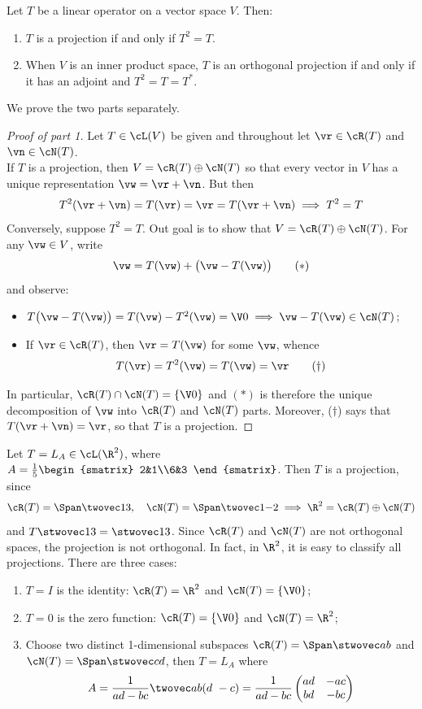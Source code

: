\begin{thm}{}{}
Let $T$ be a linear operator on a vector space $V$. Then:
\begin{enumerate}
  \item $T$ is a projection if and only if $T^2=T$.
  \item When $V$ is an inner product space, $T$ is an orthogonal projection if and only if it has an adjoint and $T^2=T=T^*$. 
\end{enumerate}
\end{thm}

We prove the two parts separately.

\begin{proof}[Proof of part 1]
Let $T\in\cL(V)$ be given and throughout let $\vr\in\cR(T)$ and $\vn\in\cN(T)$.\\[5pt]
  If $T$ is a projection, then $V=\cR(T)\oplus \cN(T)$ so that every vector in $V$ has a unique representation $\vw=\vr+\vn$. But then
  \[T^2(\vr+\vn)=T(\vr)=\vr=T(\vr+\vn)\implies T^2=T\]
  Conversely, suppose $T^2=T$. Out goal is to show that $V=\cR(T)\oplus\cN(T)$. For any $\vw\in V$, write
  \[\vw=T(\vw)+\bigl(\vw-T(\vw)\bigr)\tag{$\ast$}\]
  and observe:
  \begin{itemize}
    \item $T\bigl(\vw-T(\vw)\bigr)=T(\vw)-T^2(\vw)=\V0\implies \vw-T(\vw)\in\cN(T)$;
    \item If $\vr\in\cR(T)$, then $\vr=T(\vw)$ for some $\vw$, whence
  	\[T(\vr)=T^2(\vw)=T(\vw)=\vr\tag{$\dag$}\]
  \end{itemize}
  In particular, $\cR(T)\cap\cN(T)=\{\V0\}$ and $(\ast)$ is therefore the unique decomposition of $\vw$ into $\cR(T)$ and $\cN(T)$ parts. Moreover, ($\dag$) says that $T(\vr+\vn)=\vr$, so that $T$ is a projection.
\end{proof}

\begin{example}{}{}
Let $T=L_A\in\cL(\R^2)$, where $A=\frac 15\begin{smatrix}
2&1\\6&3
\end{smatrix}$. Then $T$ is a projection, since
\[\cR(T)=\Span\twovec 13,\quad \cN(T)=\Span\twovec 1{-2} \implies \R^2=\cR(T)\oplus\cN(T)\]
and $T\stwovec 13=\stwovec 13$. Since $\cR(T)$ and $\cN(T)$ are not orthogonal spaces, the projection is not orthogonal.
In fact, in $\R^2$, it is easy to classify all projections. There are three cases:
\begin{enumerate}
  \item $T=I$ is the identity: $\cR(T)=\R^2$ and $\cN(T)=\{\V0\}$;
  \item $T=0$ is the zero function: $\cR(T)=\{\V0\}$ and $\cN(T)=\R^2$;
  \item Choose two distinct 1-dimensional subspaces $\cR(T)=\Span\stwovec ab$ and $\cN(T)=\Span\stwovec cd$, then $T=L_A$ where
  \[A=\frac 1{ad-bc}\twovec ab(d\ -c)=\frac 1{ad-bc}\begin{pmatrix}
  ad&-ac\\bd&-bc
  \end{pmatrix}\]
\end{enumerate}
\end{example}

